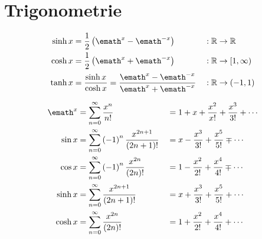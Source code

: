 \section{Trigonometrie}
	\begin{definition}[Hyperbelfunktionen]
		\begin{align*}
			\sinh x &= \frac{1}{2} \left( \emath^x - \emath^{-x} \right) & &: \mathbb{R} \to \mathbb{R} \\
			\cosh x &= \frac{1}{2} \left( \emath^x + \emath^{-x} \right) & &: \mathbb{R} \to [1,\infty) \\
			\tanh x &= \frac{\sinh x}{\cosh x} = \frac{\emath^x - \emath^{-x}}{\emath^x + \emath^{-x}} & &: \mathbb{R} \to (-1,1)
		\end{align*}
	\end{definition}
	\begin{proofhelp}
		\begin{align*}
			\emath ^x &= \sum\limits_{n = 0}^{\infty} \frac{x^n}{n!} & &= 1 + x + \frac{x^2}{x!} + \frac{x^3}{3!} + \cdots \\
			\sin x &= \sum\limits_{n = 0}^{\infty} \left( -1 \right)^n \frac{x^{2n + 1}}{\left( 2n+ 1 \right) !} & &= x - \frac{x^3}{3!} +  \frac{x^5}{5!} \mp \cdots \\
			\cos x &= \sum\limits_{n = 0}^{\infty} \left( -1 \right)^n \frac{x^{2n}}{\left( 2n \right) !} & &= 1 - \frac{x^2}{2!} + \frac{x^4}{4!} \mp \cdots \\
			\sinh x &= \sum\limits_{n = 0}^{\infty} \frac{x^{2n + 1}}{\left( 2n+ 1 \right) !} & &= x + \frac{x^3}{3!} + \frac{x^5}{5!} + \cdots \\
			\cosh x &= \sum\limits_{n = 0}^{\infty} \frac{x^{2n}}{\left( 2n \right) !} & &= 1 + \frac{x^2}{2!} + \frac{x^4}{4!} + \cdots
		\end{align*}
	\end{proofhelp}
